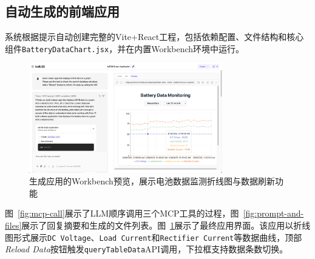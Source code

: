 \subsection{自动生成的前端应用}

系统根据提示自动创建完整的Vite+React工程，包括依赖配置、文件结构和核心组件\texttt{BatteryDataChart.jsx}，并在内置Workbench环境中运行。

\begin{figure}[t]
  \centering
  \includegraphics[width=0.75\textwidth,height=0.75\textheight,keepaspectratio]{figures/screenshots/iotdb-demo/app-preview.png}
  \caption{生成应用的Workbench预览，展示电池数据监测折线图与数据刷新功能}
  \label{fig:app-preview}
\end{figure}

图~\ref{fig:mcp-call}展示了LLM顺序调用三个MCP工具的过程，图~\ref{fig:prompt-and-files}展示了回复摘要和生成的文件列表。图~\ref{fig:app-preview}展示了最终应用界面。该应用以折线图形式展示\texttt{DC Voltage}、\texttt{Load Current}和\texttt{Rectifier Current}等数据曲线，顶部\textit{Reload Data}按钮触发\texttt{queryTableData}API调用，下拉框支持数据条数切换。